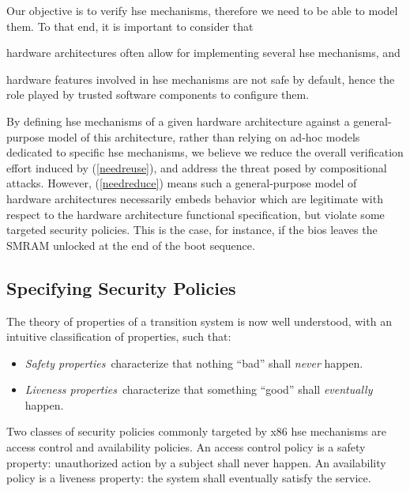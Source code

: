 Our objective is to verify \ac{hse} mechanisms, therefore we need to be able to
model them.
%
To that end, it is important to consider that
%
\begin{inparaenum}[(1)]
\item \label{needreuse}%
  hardware architectures often allow for implementing several \ac{hse}
  mechanisms, and
\item \label{needreduce}%
  hardware features involved in \ac{hse} mechanisms are not safe by default,
  hence the role played by trusted software components to configure them.
\end{inparaenum}
%
By defining \ac{hse} mechanisms of a given hardware architecture against a
general-purpose model of this architecture, rather than relying on ad-hoc models
dedicated to specific \ac{hse} mechanisms, we believe we reduce the overall
verification effort induced by (\ref{needreuse}), and address the threat posed
by compositional attacks.
%
However, (\ref{needreduce}) means such a general-purpose model of hardware
architectures necessarily embeds behavior which are legitimate with respect to
the hardware architecture functional specification, but violate some targeted
security policies.
%
This is the case, for instance, if the \ac{bios} leaves the SMRAM unlocked at
the end of the boot sequence.

\subsection{Specifying Security Policies}
\label{subsec:sota:security}

The theory of properties of a transition system is now well understood, with an
intuitive classification of properties, such that:
%
\begin{itemize}
\item \emph{Safety properties}\,\cite{lamport1977proving,lamport1985logical}
  characterize that nothing ``bad'' shall \emph{never} happen.
\item \emph{Liveness properties}\,\cite{lamport1985logical,alpern1985liveness}
  characterize that something ``good'' shall \emph{eventually} happen.
\end{itemize}

Two classes of security policies commonly targeted by x86 \ac{hse} mechanisms
are access control and availability policies.
%
An access control policy is a safety property: unauthorized action by a subject
shall never happen.
%
An availability policy is a liveness property: the system shall eventually
satisfy the service.

